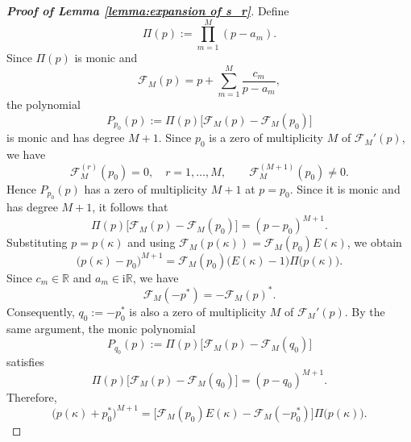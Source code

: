 \documentclass[preprint,3p,10pt]{elsarticle}
\theoremstyle{definition}
\begin{document}
\begin{proof}[\bf Proof of Lemma \ref{lemma:expansion of s_r}]
Define
\begin{equation}
\Pi(p):=\prod_{m=1}^{M}(p-a_m).
\end{equation}
Since \(\Pi(p)\) is monic and
\[
\mathcal F_M(p)=p+\sum_{m=1}^{M}\frac{c_m}{p-a_m},
\]
the polynomial
\begin{equation}
P_{p_0}(p)
:=
\Pi(p)\bigl[\mathcal F_M(p)-\mathcal F_M(p_0)\bigr]
\end{equation}
is monic and has degree \(M+1\).
Since \(p_0\) is a zero of multiplicity \(M\) of
\(\mathcal F_M'(p)\), we have
\begin{equation}
\mathcal F_M^{(r)}(p_0)=0,
\quad r=1,\ldots,M,
\qquad
\mathcal F_M^{(M+1)}(p_0)\neq0.
\end{equation}
Hence \(P_{p_0}(p)\) has a zero of multiplicity \(M+1\) at
\(p=p_0\). Since it is monic and has degree \(M+1\), it follows that
\begin{equation}\label{eq:P1-factor}
\Pi(p)\bigl[\mathcal F_M(p)-\mathcal F_M(p_0)\bigr]
=
(p-p_0)^{M+1}.
\end{equation}
Substituting \(p=p(\kappa)\) and using
\(\mathcal F_M(p(\kappa))=\mathcal F_M(p_0)E(\kappa)\), we obtain
\begin{equation}\label{eq:key-factor1-Q}
\bigl(p(\kappa)-p_0\bigr)^{M+1}
=
\mathcal F_M(p_0)\bigl(E(\kappa)-1\bigr)
\Pi\bigl(p(\kappa)\bigr).
\end{equation}
Since \(c_m\in\mathbb R\) and \(a_m\in\mathrm{i}\mathbb R\), we have
\begin{equation}
\mathcal F_M(-p^*)=-\mathcal F_M(p)^*.
\end{equation}
Consequently, \(q_0:=-p_0^*\) is also a zero of multiplicity \(M\)
of \(\mathcal F_M'(p)\). By the same argument, the monic polynomial
\begin{equation}
P_{q_0}(p)
:=
\Pi(p)\bigl[\mathcal F_M(p)-\mathcal F_M(q_0)\bigr]
\end{equation}
satisfies
\begin{equation}
\Pi(p)\bigl[\mathcal F_M(p)-\mathcal F_M(q_0)\bigr]
=
(p-q_0)^{M+1}.
\end{equation}
Therefore,
\begin{equation}\label{eq:key-factor2-Q}
\bigl(p(\kappa)+p_0^*\bigr)^{M+1}
=
\bigl[
\mathcal F_M(p_0)E(\kappa)-\mathcal F_M(-p_0^*)
\bigr]
\Pi\bigl(p(\kappa)\bigr).
\end{equation}


\end{proof}
\end{document}
